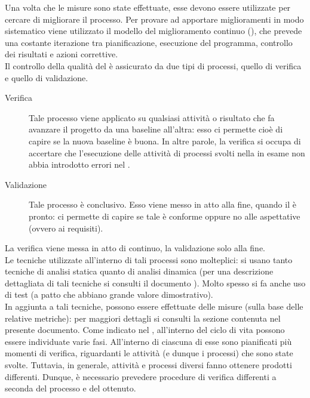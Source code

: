 			Una volta che le misure sono state effettuate, esse devono essere utilizzate per cercare di migliorare il processo. Per provare ad apportare miglioramenti in modo sistematico viene utilizzato il modello del miglioramento continuo (), che prevede una costante iterazione tra pianificazione, esecuzione del programma, controllo dei risultati e azioni correttive.\\
			Il controllo della qualità del  è assicurato da due tipi di processi, quello di verifica e quello di validazione.
			\begin{description}
				\item[Verifica] Tale processo viene applicato su qualsiasi attività o risultato che fa avanzare il progetto da una baseline all'altra: esso 
				ci permette cioè di capire se la nuova baseline è buona. In altre parole, la verifica si occupa di accertare che l'esecuzione delle attività 
				di processi svolti nella  in esame non abbia introdotto errori nel .
				\item[Validazione] Tale processo è conclusivo. Esso viene messo in atto alla fine, quando il  è pronto: ci permette di capire se tale  è conforme oppure no alle aspettative (ovvero ai requisiti).
			\end{description}
			La verifica viene messa in atto di continuo, la validazione solo alla fine.\\
			Le tecniche utilizzate all'interno di tali processi sono molteplici: si usano tanto tecniche di analisi statica quanto di analisi dinamica (per una descrizione dettagliata di tali tecniche si consulti il documento ). Molto spesso si fa anche uso di test (a patto che abbiano grande valore dimostrativo).\\
			In aggiunta a tali tecniche, possono essere effettuate delle misure (sulla base delle relative metriche): per maggiori dettagli si consulti la sezione  contenuta nel presente documento.
		Come indicato nel , all'interno del ciclo di vita possono essere individuate varie fasi. All'interno di ciascuna di esse sono pianificati più momenti di verifica, riguardanti le attività (e dunque i processi) che sono state svolte. Tuttavia, in generale, attività e processi diversi fanno ottenere prodotti differenti. Dunque, è necessario prevedere procedure di verifica differenti a seconda del processo e del  ottenuto.\\
